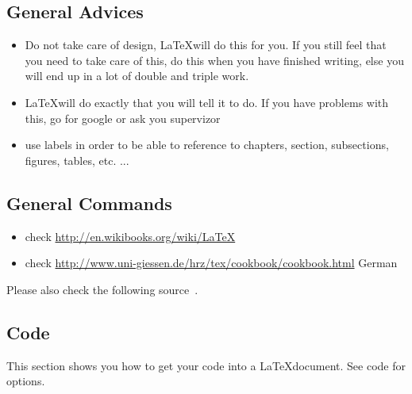 \subsection*{General Advices}
\begin{itemize}
\item Do not take care of design, \LaTeX will do this for you. If you still feel that you need to take care of this, do this when you have finished writing, else you will end up in a lot of double and triple work.
\item \LaTeX will do exactly that you will tell it to do. If you have problems with this, go for google or ask you supervizor
\item use labels in order to be able to reference to chapters, section, subsections, figures, tables, etc. ...
\end{itemize}

\subsection*{General Commands}
\begin{itemize}
\item check \url{http://en.wikibooks.org/wiki/LaTeX}
\item check \url{http://www.uni-giessen.de/hrz/tex/cookbook/cookbook.html} German
\end{itemize}
Please also check the following source~\cite{latexcookbook2007}.

\newpage
\subsection*{Code}
This section shows you how to get your code into a \LaTeX document. See code for options.



